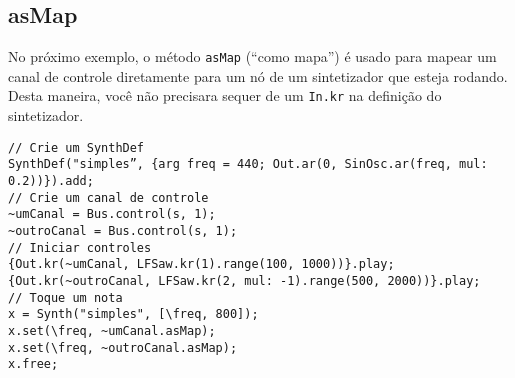 \subsection{asMap}

No próximo exemplo, o método \texttt{asMap} (“como mapa”) é usado para mapear um canal de controle diretamente para um nó de um sintetizador que esteja rodando. Desta maneira, você não precisara sequer de um \texttt{In.kr} na definição do sintetizador.

\begin{lstlisting}[style=SuperCollider-IDE, basicstyle=\scttfamily\footnotesize]
// Crie um SynthDef
SynthDef("simples”, {arg freq = 440; Out.ar(0, SinOsc.ar(freq, mul: 0.2))}).add;
// Crie um canal de controle
~umCanal = Bus.control(s, 1);
~outroCanal = Bus.control(s, 1);
// Iniciar controles
{Out.kr(~umCanal, LFSaw.kr(1).range(100, 1000))}.play;
{Out.kr(~outroCanal, LFSaw.kr(2, mul: -1).range(500, 2000))}.play;
// Toque um nota
x = Synth("simples", [\freq, 800]);
x.set(\freq, ~umCanal.asMap);
x.set(\freq, ~outroCanal.asMap);
x.free;
\end{lstlisting}
